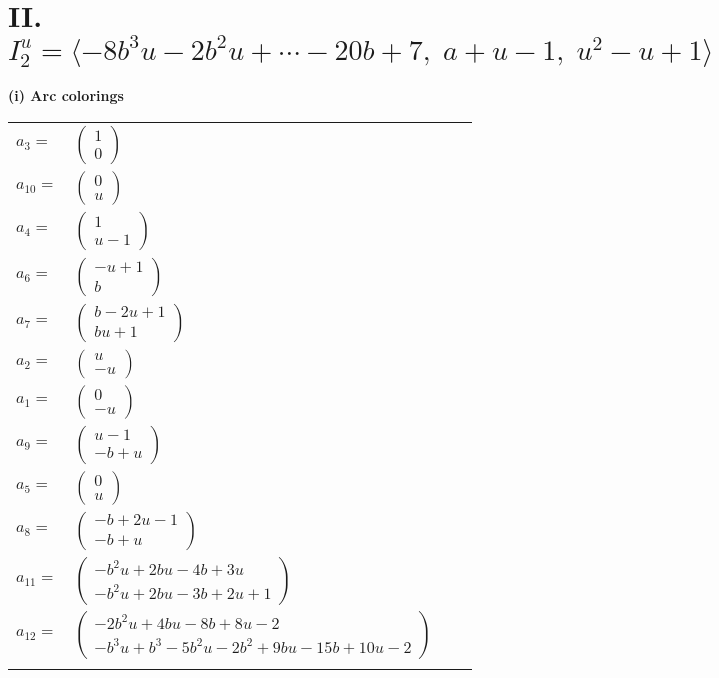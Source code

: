 \documentclass[1p]{elsarticle_modified}
\theoremstyle{definition}
\begin{document}
\centering \section*{II. $I^u_{2}= \langle -8 b^3 u-2 b^2 u+\cdots-20 b+7,\;a+u-1,\;u^2- u+1 \rangle$}
\flushleft \textbf{(i) Arc colorings}\\
\begin{tabular}{m{7pt} m{180pt} m{7pt} m{180pt} }
\flushright $a_{3}=$&$\begin{pmatrix}1\\0\end{pmatrix}$ \\
\flushright $a_{10}=$&$\begin{pmatrix}0\\u\end{pmatrix}$ \\
\flushright $a_{4}=$&$\begin{pmatrix}1\\u-1\end{pmatrix}$ \\
\flushright $a_{6}=$&$\begin{pmatrix}- u+1\\b\end{pmatrix}$ \\
\flushright $a_{7}=$&$\begin{pmatrix}b-2 u+1\\b u+1\end{pmatrix}$ \\
\flushright $a_{2}=$&$\begin{pmatrix}u\\- u\end{pmatrix}$ \\
\flushright $a_{1}=$&$\begin{pmatrix}0\\- u\end{pmatrix}$ \\
\flushright $a_{9}=$&$\begin{pmatrix}u-1\\- b+u\end{pmatrix}$ \\
\flushright $a_{5}=$&$\begin{pmatrix}0\\u\end{pmatrix}$ \\
\flushright $a_{8}=$&$\begin{pmatrix}- b+2 u-1\\- b+u\end{pmatrix}$ \\
\flushright $a_{11}=$&$\begin{pmatrix}- b^2 u+2 b u-4 b+3 u\\- b^2 u+2 b u-3 b+2 u+1\end{pmatrix}$ \\
\flushright $a_{12}=$&$\begin{pmatrix}-2 b^2 u+4 b u-8 b+8 u-2\\- b^3 u+b^3-5 b^2 u-2 b^2+9 b u-15 b+10 u-2\end{pmatrix}$\\&\end{tabular}
\end{document}
